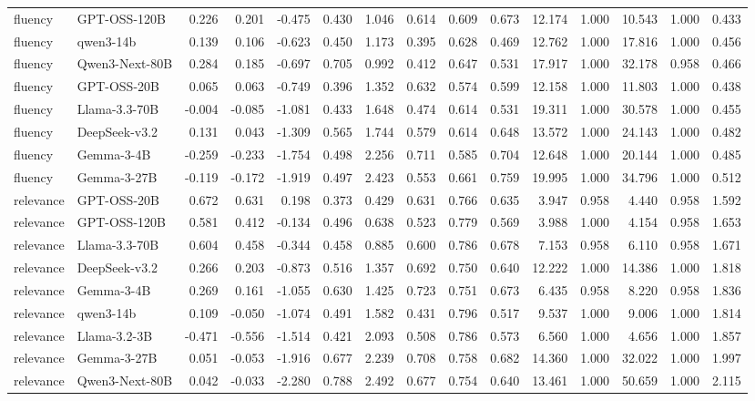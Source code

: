 \begin{table}[t]
{\begin{tabular}{llrrrrrrrrrrrrr}
fluency & GPT-OSS-120B & 0.226 & 0.201 & -0.475 & 0.430 & 1.046 & 0.614 & 0.609 & 0.673 & 12.174 & 1.000 & 10.543 & 1.000 & 0.433 \\
fluency & qwen3-14b & 0.139 & 0.106 & -0.623 & 0.450 & 1.173 & 0.395 & 0.628 & 0.469 & 12.762 & 1.000 & 17.816 & 1.000 & 0.456 \\
fluency & Qwen3-Next-80B & 0.284 & 0.185 & -0.697 & 0.705 & 0.992 & 0.412 & 0.647 & 0.531 & 17.917 & 1.000 & 32.178 & 0.958 & 0.466 \\
fluency & GPT-OSS-20B & 0.065 & 0.063 & -0.749 & 0.396 & 1.352 & 0.632 & 0.574 & 0.599 & 12.158 & 1.000 & 11.803 & 1.000 & 0.438 \\
fluency & Llama-3.3-70B & -0.004 & -0.085 & -1.081 & 0.433 & 1.648 & 0.474 & 0.614 & 0.531 & 19.311 & 1.000 & 30.578 & 1.000 & 0.455 \\
fluency & DeepSeek-v3.2 & 0.131 & 0.043 & -1.309 & 0.565 & 1.744 & 0.579 & 0.614 & 0.648 & 13.572 & 1.000 & 24.143 & 1.000 & 0.482 \\
fluency & Gemma-3-4B & -0.259 & -0.233 & -1.754 & 0.498 & 2.256 & 0.711 & 0.585 & 0.704 & 12.648 & 1.000 & 20.144 & 1.000 & 0.485 \\
fluency & Gemma-3-27B & -0.119 & -0.172 & -1.919 & 0.497 & 2.423 & 0.553 & 0.661 & 0.759 & 19.995 & 1.000 & 34.796 & 1.000 & 0.512 \\
relevance & GPT-OSS-20B & 0.672 & 0.631 & 0.198 & 0.373 & 0.429 & 0.631 & 0.766 & 0.635 & 3.947 & 0.958 & 4.440 & 0.958 & 1.592 \\
relevance & GPT-OSS-120B & 0.581 & 0.412 & -0.134 & 0.496 & 0.638 & 0.523 & 0.779 & 0.569 & 3.988 & 1.000 & 4.154 & 0.958 & 1.653 \\
relevance & Llama-3.3-70B & 0.604 & 0.458 & -0.344 & 0.458 & 0.885 & 0.600 & 0.786 & 0.678 & 7.153 & 0.958 & 6.110 & 0.958 & 1.671 \\
relevance & DeepSeek-v3.2 & 0.266 & 0.203 & -0.873 & 0.516 & 1.357 & 0.692 & 0.750 & 0.640 & 12.222 & 1.000 & 14.386 & 1.000 & 1.818 \\
relevance & Gemma-3-4B & 0.269 & 0.161 & -1.055 & 0.630 & 1.425 & 0.723 & 0.751 & 0.673 & 6.435 & 0.958 & 8.220 & 0.958 & 1.836 \\
relevance & qwen3-14b & 0.109 & -0.050 & -1.074 & 0.491 & 1.582 & 0.431 & 0.796 & 0.517 & 9.537 & 1.000 & 9.006 & 1.000 & 1.814 \\
relevance & Llama-3.2-3B & -0.471 & -0.556 & -1.514 & 0.421 & 2.093 & 0.508 & 0.786 & 0.573 & 6.560 & 1.000 & 4.656 & 1.000 & 1.857 \\
relevance & Gemma-3-27B & 0.051 & -0.053 & -1.916 & 0.677 & 2.239 & 0.708 & 0.758 & 0.682 & 14.360 & 1.000 & 32.022 & 1.000 & 1.997 \\
relevance & Qwen3-Next-80B & 0.042 & -0.033 & -2.280 & 0.788 & 2.492 & 0.677 & 0.754 & 0.640 & 13.461 & 1.000 & 50.659 & 1.000 & 2.115 \\
\bottomrule
\end{tabular}
}
\end{table}